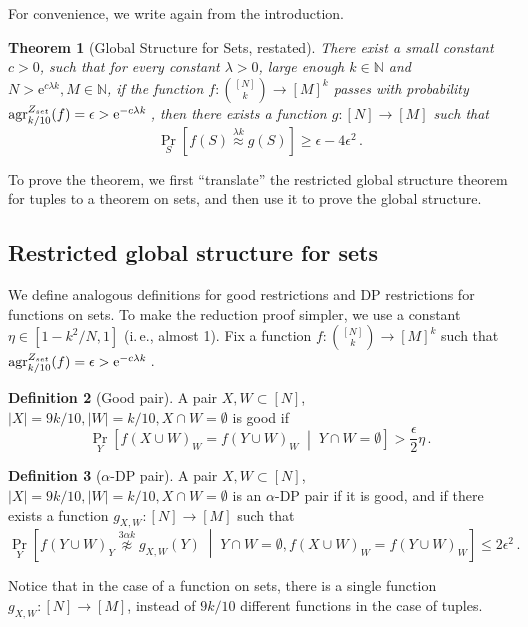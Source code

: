 \documentclass[11pt]{article}
\numberwithin{equation}{section}
\newtheorem{theorem}{Theorem}[section]
\theoremstyle{definition}
\newtheorem{definition}[theorem]{Definition}
\theoremstyle{plain}
\newcommand{\eee}{\mathrm e}
\newcommand{\ie}{i.\,e.}
\newcommand{\Prob}[2][]{\Pr_{{#1}}\left[#2\right]} %
\newcommand{\abs}[1]{\lvert#1\rvert} %
\newcommand{\given}{\;\middle\vert\;} %
\newcommand\f{f} %
\newcommand\setf{f} %
\newcommand{\g}{g} %
\newcommand{\test}[2]{
	\ifx &#2&
	\textrm{agr}^{#1}
	\else	
	\textrm{agr}^{#1}_{#2}
	\fi}
\newcommand\neql[1]{\stackrel{{#1}}{ \approx}} %
\newcommand\neqg[1]{\stackrel{{#1}}{ \not\approx}} %
\newcommand{\sets}{\binom{[N]}{k}} %
\begin{document}
For convenience, we write again  from the introduction.
\begin{theorem}[Global Structure for Sets, restated]
	There exist a small constant $c>0$, such that for every constant $\lambda>0$, large enough $k\in\mathbb{N}$ and $N > \eee^{c\lambda k},M\in\mathbb{N}$, if the function $\setf:\sets\rightarrow[M]^k$ passes  with probability $\test{Z_{set}}{k/10}(\f)=\epsilon > \eee^{-c\lambda k}$\,, then there exists a function $\g:[N]\rightarrow[M]$ such that
	\[ \Prob[S]{\setf(S)\neql{\lambda k}\g(S)} \geq \epsilon - 4\epsilon^2 \,.\]%
\end{theorem}

To prove the theorem, we first  ``translate'' the restricted global structure theorem for tuples to a theorem on sets, and then use it to prove the global structure.
\subsection{Restricted global structure for sets}
We define analogous definitions for good restrictions and DP restrictions for functions on sets. To make the reduction proof simpler, we use a constant
$\eta\in\left[1- k^2/N, 1\right]$ (\ie, almost 1). Fix a function $\f:\binom{[N]}{k}\rightarrow [M]^k$ such that $\test{Z_{set}}{k/10}(\f)=\epsilon > \eee^{-c\lambda k}$\,.

\begin{definition}[Good pair]
	A pair $X,W\subset[N]$, $\abs{X}=9k/10,\abs{W}=k/10, X\cap W=\emptyset$ is good if \[\Prob[Y]{\f(X\cup W)_W = \f(Y\cup W)_W\given  Y\cap W=\emptyset} > \frac{\epsilon}{2}\eta\,.\]%
\end{definition}

\begin{definition}[$\alpha$-DP pair]
	A pair $X,W\subset[N]$, $\abs{X}=9k/10,\abs{W}=k/10, X\cap W=\emptyset$ is an $\alpha$-DP pair if it is good, and if there exists a function $\g_{X,W}:[N]\rightarrow[M]$ such that
	\[	\Prob[Y]{\f(Y\cup W)_Y \neqg{3\alpha k} \g_{X,W}(Y)\given Y\cap W=\emptyset, \f(X\cup W)_W = \f(Y\cup W)_W} \leq 2\epsilon^{2 }\,.\]%
\end{definition}
Notice that in the case of a function on sets, there is a single function $\g_{X,W}:[N]\rightarrow[M]$, instead of $9k/10$ different functions in the case of tuples. 
\end{document}
